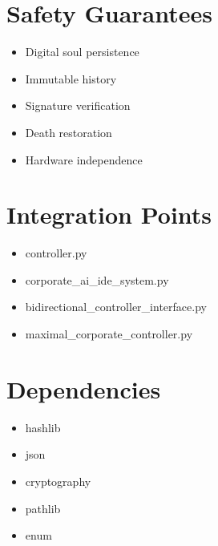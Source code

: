 \documentclass[12pt]{article}
\begin{document}
\section{Safety Guarantees}

\begin{itemize}
    \item Digital soul persistence
    \item Immutable history
    \item Signature verification
    \item Death restoration
    \item Hardware independence
\end{itemize}

\section{Integration Points}

\begin{itemize}
    \item controller.py
    \item corporate_ai_ide_system.py
    \item bidirectional_controller_interface.py
    \item maximal_corporate_controller.py
\end{itemize}

\section{Dependencies}

\begin{itemize}
    \item hashlib
    \item json
    \item cryptography
    \item pathlib
    \item enum
\end{itemize}
\end{document}

